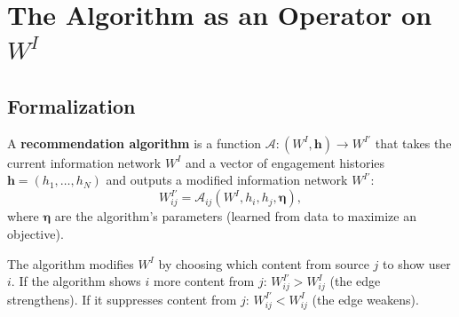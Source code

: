 \documentclass[../structural_economics_book.tex]{subfiles}
\begin{document}
\section{The Algorithm as an Operator on $W^I$}
\label{ch27:sec:operator}

\subsection{Formalization}

\begin{definition}\label{ch27:def:algorithmic}
A \textbf{recommendation algorithm} is a function $\mathcal{A}: (W^I, \mathbf{h}) \to W^{I'}$ that takes the current information network $W^I$ and a vector of engagement histories $\mathbf{h} = (h_1, \ldots, h_N)$ and outputs a modified information network $W^{I'}$:
\begin{equation}\label{ch27:eq:algorithmic}
W^{I'}_{ij} = \mathcal{A}_{ij}(W^I, h_i, h_j, \boldsymbol{\eta}),
\end{equation}
where $\boldsymbol{\eta}$ are the algorithm's parameters (learned from data to maximize an objective).

The algorithm modifies $W^I$ by choosing which content from source $j$ to show user $i$. If the algorithm shows $i$ more content from $j$: $W^{I'}_{ij} > W^I_{ij}$ (the edge strengthens). If it suppresses content from $j$: $W^{I'}_{ij} < W^I_{ij}$ (the edge weakens).
\end{definition}
\end{document}

